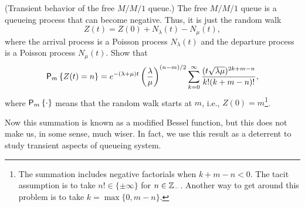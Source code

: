 \begin{question} (Transient behavior of the free $M/M/1$ queue.)  The
  free $M/M/1$ queue is a queueing process that can become
  negative. Thus, it is just the random walk
\begin{equation*}
  Z(t) = Z(0) + N_\lambda(t) - N_\mu(t), 
\end{equation*}
where the arrival process is a Poisson process $N_\lambda(t)$ and the
departure process is a Poisson process $N_\mu(t)$. Show that
\begin{equation*}
    \P{Z(t)=n}_m 
= e^{-(\lambda+\mu)t} \left(\frac\lambda\mu\right)^{(n-m)/2} \sum_{k=0}^\infty 
\frac{(t\sqrt{\lambda\mu} )^{2k+m-n}}{k!(k+m-n)!},
\end{equation*}
where $\P{\cdot}_m$ means that the random walk starts at $m$, i.e.,
$Z(0)=m$\footnote{The summation includes negative factorials when
$k+m-n<0$. The tacit assumption is to take $n!\in \{\pm \infty\}$ for
$n\in \mathbb{Z}_-$. Another way to get around this problem is to take
$k=\max\{0, m-n\}$.}.


Now this summation is known as a modified Bessel function, but this
does not make us, in some sense, much wiser. In fact, we use this
result as a deterrent to study transient aspects of queueing system.

\begin{hint}
  
\end{hint}



\end{question}

